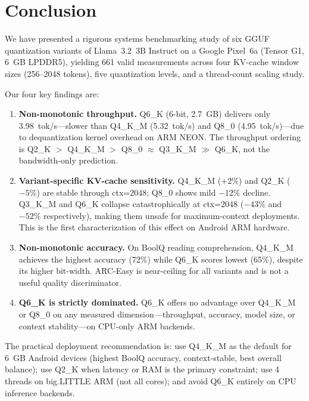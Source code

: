 \documentclass[conference]{IEEEtran}
\begin{document}
\section{Conclusion}

We have presented a rigorous systems benchmarking study of six GGUF quantization
variants of Llama~3.2~3B Instruct on a Google Pixel~6a (Tensor G1, 6~GB LPDDR5),
yielding 661 valid measurements across four KV-cache window sizes (256--2048 tokens),
five quantization levels, and a thread-count scaling study.

Our four key findings are:

\begin{enumerate}
  \item \textbf{Non-monotonic throughput.} Q6\_K (6-bit, 2.7~GB) delivers only
        3.98~tok/s---slower than Q4\_K\_M (5.32~tok/s) and Q8\_0 (4.95~tok/s)---due
        to dequantization kernel overhead on ARM NEON. The throughput ordering
        is Q2\_K $>$ Q4\_K\_M $>$ Q8\_0 $\approx$ Q3\_K\_M $\gg$ Q6\_K, not
        the bandwidth-only prediction.

  \item \textbf{Variant-specific KV-cache sensitivity.} Q4\_K\_M ($+2\%$) and
        Q2\_K ($-5\%$) are stable through ctx=2048; Q8\_0 shows mild $-12\%$
        decline. Q3\_K\_M and Q6\_K collapse catastrophically at ctx=2048
        ($-43\%$ and $-52\%$ respectively), making them unsafe for
        maximum-context deployments. This is the first characterization of
        this effect on Android ARM hardware.

  \item \textbf{Non-monotonic accuracy.} On BoolQ reading comprehension,
        Q4\_K\_M achieves the highest accuracy (72\%) while Q6\_K scores
        lowest (65\%), despite its higher bit-width. ARC-Easy is near-ceiling
        for all variants and is not a useful quality discriminator.

  \item \textbf{Q6\_K is strictly dominated.} Q6\_K offers no advantage over
        Q4\_K\_M or Q8\_0 on any measured dimension---throughput, accuracy,
        model size, or context stability---on CPU-only ARM backends.
\end{enumerate}

The practical deployment recommendation is: use Q4\_K\_M as the default for
6~GB Android devices (highest BoolQ accuracy, context-stable, best overall
balance); use Q2\_K when latency or RAM is the primary constraint; use 4 threads
on big.LITTLE ARM (not all cores); and avoid Q6\_K entirely on CPU inference
backends.
\end{document}
